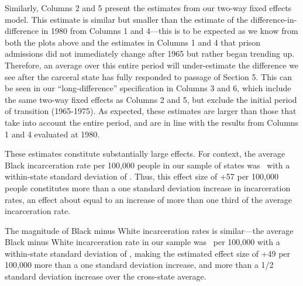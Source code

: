 \documentclass[12pt]{article}
\begin{document}
Similarly, Columns 2 and 5 present the estimates from our two-way fixed effects model. This estimate is similar but smaller than the estimate of the difference-in-difference in 1980 from Columns 1 and 4---this is to be expected as we know from both the plots above and the estimates in Columns 1 and 4 that prison admissions did not immediately change after 1965 but rather began trending up.  Therefore, an average over this entire period will under-estimate the difference we see after the carceral state has fully responded to passage of Section 5.  This can be seen in our ``long-difference'' specification in Columns 3 and 6, which include the same two-way fixed effects as Columns 2 and 5, but exclude the initial period of transition (1965-1975).  As expected, these estimates are larger than those that take into account the entire period, and are in line with the results from Columns 1 and 4 evaluated at 1980.

These estimates constitute substantially large effects. For context, the average Black incarceration rate per 100,000 people in our sample of states was \unskip~with a within-state standard deviation of \unskip. Thus, this effect size of +57 per 100,000 people constitutes more than a one standard deviation increase in incarceration rates, an effect about equal to an increase of more than one third of the average incarceration rate.

The magnitude of Black minus White incarceration rates is similar---the average Black minus White incarceration rate in our sample was \unskip~per 100,000 with a within-state standard deviation of \unskip, making the estimated effect size of +49 per 100,000 more than a one standard deviation increase, and more than a 1/2 standard deviation increase over the cross-state average.
\end{document}
